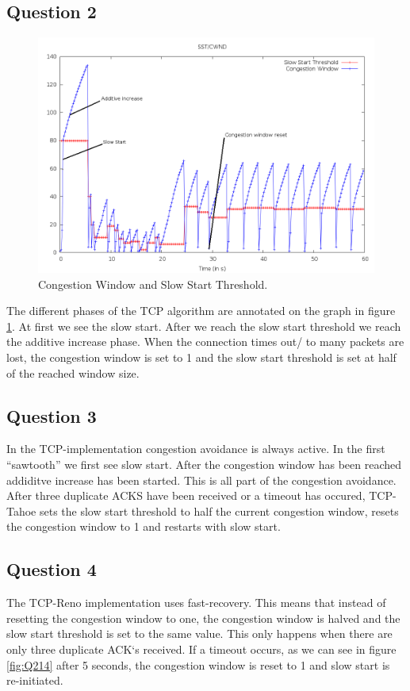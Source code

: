 \documentclass[11pt,a4paper]{article}
\begin{document}
\subsection{Question 2}
\begin{figure}[h!]
 \centering
 \includegraphics[width = 0.9\linewidth]{./ex2-part1-cwnd-sst.png}
 \caption{Congestion Window and Slow Start Threshold.}
 \label{fig:Q22}
\end{figure}
The different phases of the TCP algorithm are annotated on the graph in figure \ref{fig:Q22}.
At first we see the slow start. After we reach the slow start threshold we reach the additive increase phase. When the connection times out/ to many packets are lost, the congestion window is set
to 1 and the slow start threshold is set at half of the reached window size.

\subsection{Question 3}
In the TCP-implementation congestion avoidance is always active. In the first ``sawtooth'' we first see slow start. After the congestion window has been reached addiditve increase has been started. This is all part
of the congestion avoidance. After three duplicate ACKS have been received or a timeout has occured, TCP-Tahoe sets the slow start threshold to half the current congestion window, resets the congestion window to 1 and restarts with slow start.

\subsection{Question 4}
The TCP-Reno implementation uses fast-recovery. This means that instead of resetting the congestion window to one, the
congestion window is halved and the slow start threshold is set to the same value. This only happens when there are only
three duplicate ACK`s received. If a timeout occurs, as we can see in figure \ref{fig:Q214} after 5 seconds, the congestion
window is reset to 1 and slow start is re-initiated.
\end{document}
